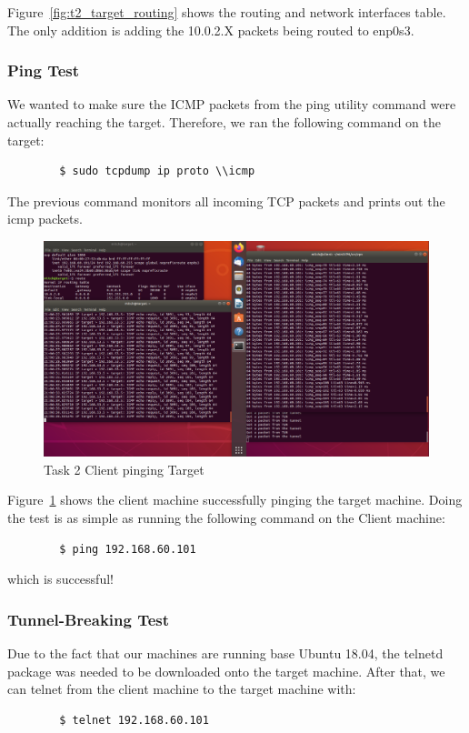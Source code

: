 \documentclass[12pt]{article}
\newcommand\tab[1][0.5cm]{\hspace*{#1}}
\begin{document}
    Figure~\ref{fig:t2_target_routing} shows the routing and network interfaces table. The only addition is adding the 10.0.2.X packets being routed to enp0s3.

\subsubsection{Ping Test}
    We wanted to make sure the ICMP packets from the ping utility command were actually reaching the target. Therefore, we ran the following command on the target:
    \begin{verbatim}
        $ sudo tcpdump ip proto \\icmp
    \end{verbatim}
    The previous command monitors all incoming TCP packets and prints out the icmp packets.

    \begin{figure}[H]
        \begin{center}
            \includegraphics[scale=0.25]{t2_successful_ping.png}
        \end{center}{}
        \caption{Task 2 Client pinging Target}
        \label{fig:t2_successful_ping}
    \end{figure}
    
    Figure~\ref{fig:t2_successful_ping} shows the client machine successfully pinging the target machine. Doing the test is as simple as running the following command on the Client machine:
    
    \begin{verbatim}
        $ ping 192.168.60.101
    \end{verbatim}

    which is successful!
\subsubsection{Tunnel-Breaking Test}
    \tab Due to the fact that our machines are running base Ubuntu 18.04, the telnetd package was needed to be downloaded onto the target machine. After that, we can telnet from the client machine to the target machine with:
    \begin{verbatim}
        $ telnet 192.168.60.101
    \end{verbatim}
\end{document}
